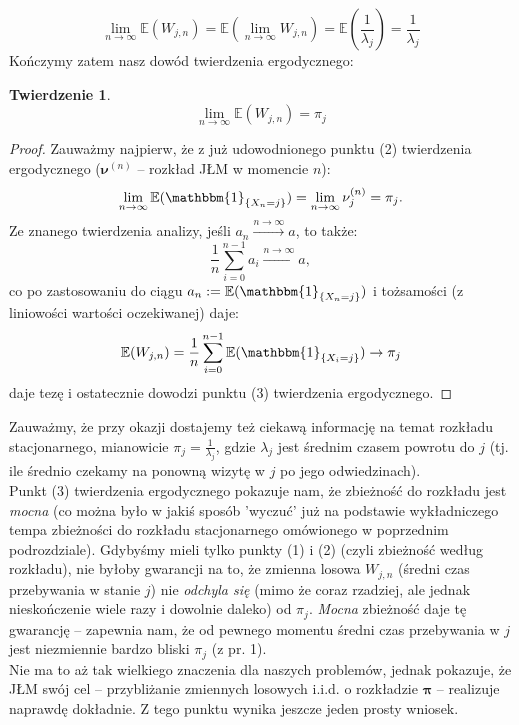 \documentclass[a4paper]{article}
\theoremstyle{defn}
\theoremstyle{theorem}
\newtheorem{theorem}[defn]{Twierdzenie}
\theoremstyle{lemma}
\theoremstyle{cor}
\theoremstyle{fact}
\begin{document}
$$\lim\limits_{n \to \infty} \mathbb{E}(W_{j,n}) = \mathbb{E}\left( \lim\limits_{n \to \infty} W_{j,n}\right) = \mathbb{E}\left(\frac{1}{\lambda_j}\right) = \frac{1}{\lambda_j}$$
Kończymy zatem nasz dowód twierdzenia ergodycznego:
\begin{theorem}\label{theorem2.5.13}
$$\lim\limits_{n \to \infty} \mathbb{E}(W_{j,n}) = \pi_j$$
\end{theorem}
\begin{proof}
Zauważmy najpierw, że z już udowodnionego punktu (2) twierdzenia ergodycznego ($\boldsymbol{\nu}^{(n)}$ – rozkład JŁM w momencie $n$):
$$\lim\limits_{n \to \infty} \mathbb{E}(\mathbbm{1}_{\{X_n = j\}}) = \lim\limits_{n \to \infty} \nu^{(n)}_j = \pi_j.$$
Ze znanego twierdzenia analizy, jeśli $a_n \xrightarrow{n \to \infty} a$, to także: $$\frac{1}{n}\sum_{i=0}^{n-1} a_i \xrightarrow{n \to \infty} a,$$
co po zastosowaniu do ciągu $a_n := \mathbb{E}(\mathbbm{1}_{\{X_n = j\}})$ i tożsamości (z liniowości wartości oczekiwanej) daje:
$$\mathbb{E}(W_{j,n}) = \frac{1}{n} \sum\limits_{i=0}^{n-1} \mathbb{E}(\mathbbm{1}_{\{X_i = j\}}) \to \pi_j$$
daje tezę i ostatecznie dowodzi punktu (3) twierdzenia ergodycznego.
\end{proof}
Zauważmy, że przy okazji dostajemy też ciekawą informację na temat rozkładu stacjonarnego, mianowicie $\pi_j = \frac{1}{\lambda_j}$, gdzie $\lambda_j$ jest średnim czasem powrotu do $j$ (tj. ile średnio czekamy na ponowną wizytę w $j$ po jego odwiedzinach).
\\

Punkt (3) twierdzenia ergodycznego pokazuje nam, że zbieżność do rozkładu jest \textit{mocna} (co można było w jakiś sposób 'wyczuć' już na podstawie wykładniczego tempa zbieżności do rozkładu stacjonarnego omówionego w poprzednim podrozdziale). Gdybyśmy mieli tylko punkty (1) i (2) (czyli zbieżność według rozkładu), nie byłoby gwarancji na to, że zmienna losowa $W_{j,n}$ (średni czas przebywania w stanie $j$) nie \textit{odchyla się} (mimo że coraz rzadziej, ale jednak nieskończenie wiele razy i dowolnie daleko) od $\pi_j$. \textit{Mocna} zbieżność daje tę gwarancję – zapewnia nam, że od pewnego momentu średni czas przebywania w $j$ jest niezmiennie bardzo bliski $\pi_j$ (z pr. 1).\\
Nie ma to aż tak wielkiego znaczenia dla naszych problemów, jednak pokazuje, że JŁM swój cel – przybliżanie zmiennych losowych i.i.d. o rozkładzie $\boldsymbol{\pi}$ – realizuje naprawdę dokładnie. Z tego punktu wynika jeszcze jeden prosty wniosek.
\\
\end{document}
